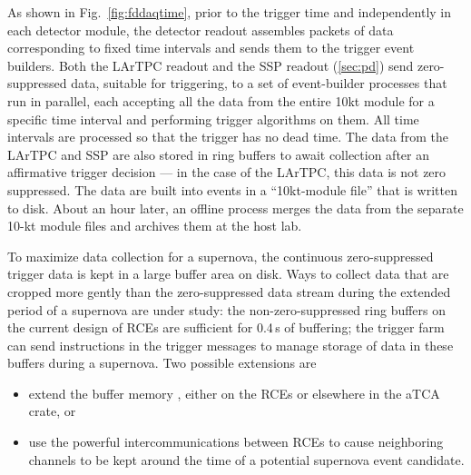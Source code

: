 As shown in Fig.~\ref{fig:fddaqtime}, prior to the trigger time and
independently in each detector module, the detector readout assembles
packets of data corresponding to fixed time intervals and sends them
to the trigger event builders.  Both the LArTPC readout and the SSP
readout (\ref{sec:pd}) send zero-suppressed data, suitable for triggering, to a set
of event-builder processes that run in parallel, each accepting all
the data from the entire 10kt module for a specific time interval and
performing trigger algorithms on them.  All time intervals are
processed so that the trigger has no dead time.  The data from the LArTPC and SSP
are also stored in ring buffers
  to await collection after an
affirmative trigger decision --- in the case of the LArTPC, this data
is not zero suppressed.  The data are built into events in a ``10kt-module
file'' that is written to disk.  About an hour later, an offline process merges
the data from the separate 10-kt module files and archives them at the host lab.

To maximize data collection for a supernova, the continuous
zero-suppressed trigger data is kept in a large buffer area on disk.
Ways to collect data that are cropped more gently than the zero-suppressed 
data stream during the extended period of a supernova are
under study: the non-zero-suppressed ring buffers on the current
design of RCEs are sufficient for 0.4\,s of buffering; the trigger farm can send
instructions in the trigger messages to manage storage of data in
these buffers during a supernova. Two possible extensions
are
\begin{itemize}
\item extend the buffer memory , either on the RCEs or elsewhere in the aTCA crate, or

\item use the powerful intercommunications between RCEs to cause neighboring
channels to be kept around the time of a potential supernova event candidate. 

\end{itemize}


